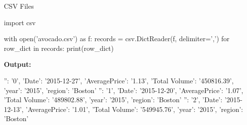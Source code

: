 \documentclass[
  american,
  ignorenonframetext,
]{beamer}
\newenvironment{pyexec}[1]{\noindent \textbf{Output: }  #1}{}
\begin{document}
\begin{frame}{CSV Files}
\protect\hypertarget{csv-files-4}{}

\begin{pythoncode}

import csv

with open('avocado.csv') as f:
    records = csv.DictReader(f, delimiter=',')
    for row_dict in records:
        print(row_dict)

\end{pythoncode}

\begin{pyexec}

\begin{outputcode}

{'': '0', 'Date': '2015-12-27', 'AveragePrice': '1.13', 'Total Volume': '450816.39', 'year': '2015', 'region': 'Boston'}
{'': '1', 'Date': '2015-12-20', 'AveragePrice': '1.07', 'Total Volume': '489802.88', 'year': '2015', 'region': 'Boston'}
{'': '2', 'Date': '2015-12-13', 'AveragePrice': '1.01', 'Total Volume': '549945.76', 'year': '2015', 'region': 'Boston'}

\end{outputcode}

\end{pyexec}


\end{frame}
\end{document}
